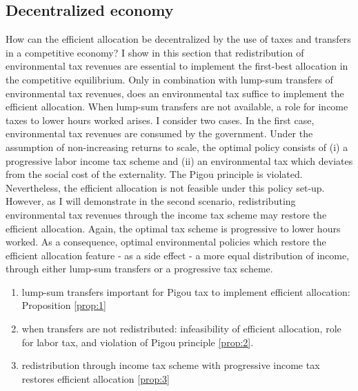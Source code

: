 \subsection{Decentralized economy}\label{subsec:decen_ec}

How can the efficient allocation be decentralized by the use of taxes and transfers in a competitive economy? %
I show in this section that redistribution of environmental tax revenues are essential to implement the first-best allocation in the competitive equilibrium. Only in combination with lump-sum transfers of  environmental tax revenues, does an environmental tax suffice to implement the efficient allocation. 
When lump-sum transfers are not available, a role for income taxes to lower hours worked arises. I consider two cases.
In the first case, environmental tax revenues are consumed by the government. Under the assumption of non-increasing returns to scale, the optimal policy consists of (i) a progressive labor income tax scheme and (ii) an environmental tax which deviates from the social cost of the externality. The Pigou principle is violated. Nevertheless, the efficient allocation is not feasible under this policy set-up.
However, as  I will demonstrate in the second scenario, redistributing environmental tax revenues through the income tax scheme may restore the efficient allocation. Again, the optimal tax scheme is progressive to lower hours worked.
As a consequence,  optimal environmental policies which restore the efficient allocation feature - as a side effect - a more equal distribution of income, through either lump-sum transfers or a progressive tax scheme.%

\begin{enumerate}
\item lump-sum transfers important for Pigou tax to implement efficient allocation: Proposition \ref{prop:1}
\item when transfers are not redistributed: infeasibility of efficient allocation,  role for labor tax, and violation of Pigou principle \ref{prop:2}.
\item redistribution through income tax scheme with progressive income tax restores efficient allocation \ref{prop:3}
\end{enumerate}

